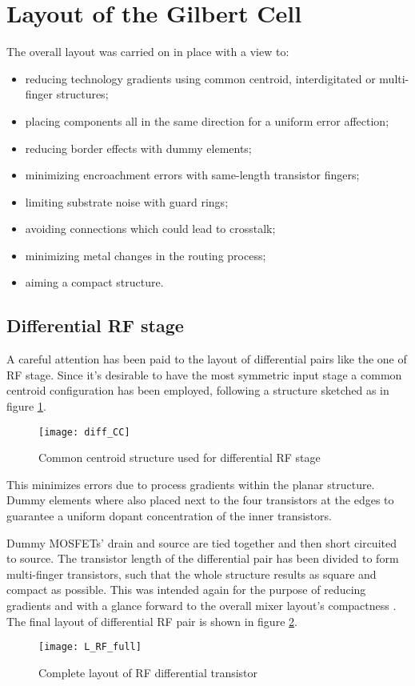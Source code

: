 \section{Layout of the Gilbert Cell}
The overall layout was carried on in place with a view to:
\begin{itemize}
	\item reducing technology gradients using common centroid, interdigitated or multi-finger structures;
	\item placing components all in the same direction for a uniform error affection;
	\item reducing border effects with dummy elements;
	\item minimizing encroachment errors with same-length transistor fingers;
 	\item limiting substrate noise with guard rings;
	\item avoiding connections which could lead to crosstalk;
	\item minimizing metal changes in the routing process;
	\item aiming a compact structure.
\end{itemize}
\subsection{Differential RF stage}
A careful attention has been paid to the layout of differential pairs like the one of RF stage. Since it's desirable to have the most symmetric input stage a common centroid configuration has been employed, following a structure sketched as in figure \ref{fig:diff_CC}. 

\begin{figure}[H]
	\centering
	\texttt{[image: diff\_CC]}
	\caption{Common centroid structure used for differential RF stage}
	\label{fig:diff_CC}
\end{figure}
This minimizes errors due to process gradients within the planar structure. Dummy elements where also placed next to the four transistors at the edges to guarantee a uniform dopant concentration of the inner transistors.

Dummy MOSFETs' drain and source are tied together and then short circuited to source.
The transistor length of the differential pair has been divided to form multi-finger  transistors, such that the whole structure results as square and compact as possible. This was intended again for the purpose of reducing gradients and with a glance forward to the overall mixer layout's compactness . The final layout of differential RF pair is shown in figure \ref{L_RF_full}.
\begin{figure}[H]
	\centering
	\texttt{[image: L\_RF\_full]}
	\caption{Complete layout of RF differential transistor}
	\label{L_RF_full}
\end{figure}


